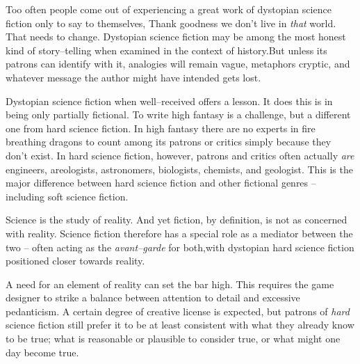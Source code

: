 

Too often people come out of experiencing a great work of dystopian science fiction only to say to themselves, Thank goodness we don't live in {\it that} world. That needs to change. Dystopian science fiction may be among the most honest kind of story--telling when examined in the context of history. But unless its patrons can identify with it, analogies will remain vague, metaphors cryptic, and whatever message the author might have intended gets lost.

    {}

Dystopian science fiction when well--received offers a lesson. It does this is in being only partially fictional. To write high fantasy is a challenge, but a different one from hard science fiction. In high fantasy there are no experts in fire breathing dragons to count among its patrons or critics simply because they don't exist. In hard science fiction, however, patrons and critics often actually {\it are} engineers, areologists, astronomers, biologists, chemists, and geologist. This is the major difference between hard science fiction and other fictional genres -- including soft science fiction.

Science is the study of reality. And yet fiction, by definition, is not as concerned with reality. Science fiction therefore has a special role as a mediator between the two -- often acting as the {\it avant--garde} for both,\footnotecite[shedroff2012] with dystopian hard science fiction positioned closer towards reality.

A need for an element of reality can set the bar high. This requires the game designer to strike a balance between attention to detail and excessive pedanticism. A certain degree of creative license is expected, but patrons of {\it hard} science fiction still prefer it to be at least consistent with what they already know to be true; what is reasonable or plausible to consider true, or what might one day become true.

